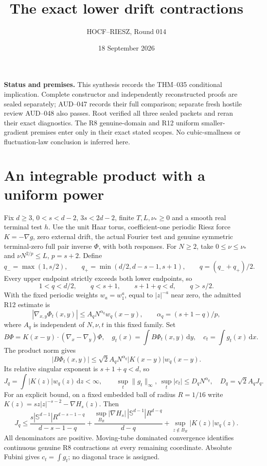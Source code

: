 \documentclass[10pt]{article}
\title{The exact lower drift contractions}
\author{HOCF--RIESZ, Round 014}
\date{18 September 2026}
\newcommand{\dd}{\,\mathrm d}
\begin{document}
\maketitle
\noindent\textbf{Status and premises.}
This synthesis records the THM--035 conditional implication. Complete
constructor and independently reconstructed proofs are sealed separately;
AUD--047 records their full comparison; separate fresh hostile review
AUD--048 also passes. Root verified all three sealed packets and reran their
exact diagnostics. The R8 genuine-domain and R12 uniform smaller-gradient
premises enter only in their exact stated scopes. No cubic-smallness or
fluctuation-law conclusion is inferred here.

\section*{An integrable product with a uniform power}
Fix $d\ge3$, $0<s<d-2$, $3s<2d-2$, finite $T,L,\nu_*\ge0$ and a smooth
real terminal test $h$. Use the unit Haar torus, coefficient-one periodic
Riesz force $K=-\nabla g$, zero external drift, the actual Fourier test and
genuine symmetric terminal-zero full pair inverse $\Phi$, with both responses.
For $N\ge2$, take $0\le\nu\le\nu_*$ and $\nu N^{2/p}\le L$, $p=s+2$.
Define
\[
 q_- =\max(1,s/2),\qquad q_+=\min(d/2,d-s-1,s+1),\qquad q=(q_-+q_+)/2.
\]
Every upper endpoint strictly exceeds both lower endpoints, so
\[
 1<q<d/2,\qquad q<s+1,\qquad s+1+q<d,\qquad q>s/2.
\]
With the fixed periodic weights $w_a=w_1^a$, equal to $|z|^{-a}$ near zero,
the admitted R12 estimate is
\[
 |\nabla_{x,y}\Phi_t(x,y)|\le A_q N^{\alpha_q}w_q(x-y),
 \qquad \alpha_q=(s+1-q)/p,
\]
where $A_q$ is independent of $N,\nu,t$ in this fixed family.
Set
\[
 B\Phi=K(x-y)\cdot(\nabla_x-\nabla_y)\Phi,\quad
 g_t(x)=\int B\Phi_t(x,y)\dd y,\quad c_t=\int g_t(x)\dd x.
\]
The product norm gives
\[
 |B\Phi_t(x,y)|\le\sqrt2 A_qN^{\alpha_q}|K(x-y)|w_q(x-y).
\]
Its relative singular exponent is $s+1+q<d$, so
\[
 J_q=\int|K(z)|w_q(z)\dd z<\infty,\qquad
 \sup_t\|g_t\|_\infty,\ \sup_t|c_t|\le D_qN^{\alpha_q},
 \quad D_q=\sqrt2 A_qJ_q.
\]
For an explicit bound, on a fixed embedded ball of radius $R=1/16$ write
$K(z)=s z|z|^{-s-2}-\nabla H_s(z)$. Then
\[
 J_q\le\frac{s|\mathbb S^{d-1}|R^{d-s-1-q}}{d-s-1-q}
 +\frac{\sup_{B_R}|\nabla H_s|\,|\mathbb S^{d-1}|R^{d-q}}{d-q}
 +\sup_{z\notin B_R}|K(z)|w_q(z).
\]
All denominators are positive. Moving-tube dominated convergence identifies
continuous genuine R8 contractions at every remaining coordinate. Absolute
Fubini gives $c_t=\int g_t$; no diagonal trace is assigned.
\end{document}
